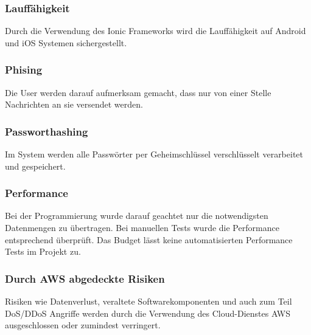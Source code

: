 \subsubsection{Lauffähigkeit}
Durch die Verwendung des Ionic Frameworks wird die Lauffähigkeit auf Android und iOS Systemen sichergestellt.
\subsubsection{Phising}
Die User werden darauf aufmerksam gemacht, dass nur von einer Stelle Nachrichten an sie versendet werden. 
\subsubsection{Passworthashing}
Im System werden alle Passwörter per Geheimschlüssel verschlüsselt verarbeitet und gespeichert.
\subsubsection{Performance}
Bei der Programmierung wurde darauf geachtet nur die notwendigsten Datenmengen zu übertragen. Bei manuellen Tests wurde die Performance entsprechend überprüft. Das Budget lässt keine automatisierten Performance Tests im Projekt zu.
\subsubsection{Durch AWS abgedeckte Risiken}
Risiken wie Datenverlust, veraltete Softwarekomponenten und auch zum Teil DoS/DDoS Angriffe werden durch die Verwendung des Cloud-Dienstes AWS ausgeschlossen oder zumindest verringert.